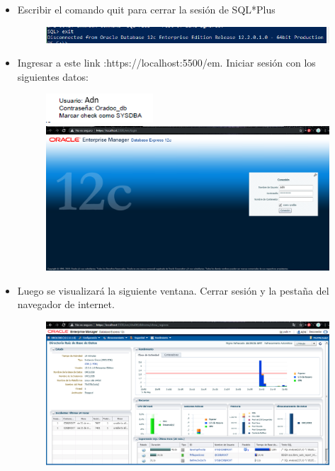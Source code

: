 \begin{itemize}
\begin{figure}[H]
\begin{center}
		\end{center}
		\end{figure}
	\item Escribir el comando quit para cerrar la sesión de SQL*Plus
		\begin{figure}[H]
		\begin{center}
		\includegraphics[width=15cm]{./Imagenes/10}
		\end{center}
		\end{figure}
	\item Ingresar a este link :https://localhost:5500/em. Iniciar sesión con los siguientes datos:
		\begin{figure}[H]
		\begin{center}
		\includegraphics[width=4cm]{./Imagenes/t1}
		\includegraphics[width=15cm]{./Imagenes/11}
		\end{center}
		\end{figure}
	\item Luego se visualizará la siguiente ventana. Cerrar sesión y la pestaña del navegador de internet.
		\begin{figure}[H]
		\begin{center}
		\includegraphics[width=15cm]{./Imagenes/12}

\end{center}
\end{figure}
\end{itemize}
